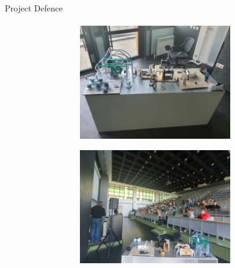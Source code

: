 \documentclass[aspectratio=169]{beamer}
\begin{document}
\begin{frame}[t]{Project Defence}
    \framesubtitle{}
    \vspace{-0.6cm}
    \begin{figure}[H]
        \begin{subfigure}[c]{0.32\textwidth}
            \centering\includegraphics[height=5cm,width=1\textwidth,keepaspectratio]{resources/fair_4.JPG}
            \label{fig:resources/fair_4.JPG}
        \end{subfigure}
        \begin{subfigure}[c]{0.32\textwidth}
            \centering\includegraphics[height=5cm,width=1\textwidth,keepaspectratio]{resources/fair_1.JPG}
            \label{fig:resources/fair_1.JPG}
        \end{subfigure}
        \begin{subfigure}[c]{0.31\textwidth}

\end{subfigure}
\end{figure}
\end{frame}
\end{document}
